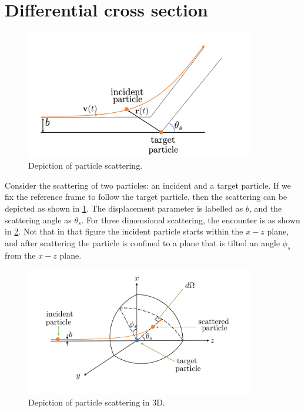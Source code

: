 \documentclass[a4paper,11pt]{report}
\begin{document}
\section{Differential cross section}
\begin{figure}[ht]
    \centering
    \includegraphics[width=10cm]{../../images/scattering.pdf}
    \caption{Depiction of particle scattering.}
    \label{fig:scattering}
\end{figure}

Consider the scattering of two particles: an incident and a target particle. If we fix the reference frame to follow the target particle, then the scattering can be depicted as shown in \cref{fig:scattering}. The displacement parameter is labelled as $b$, and the scattering angle as $\theta_s$. For three dimensional scattering, the encounter is as shown in \cref{fig:scattering_3d}. Not that in that figure the incident particle starts within the $x-z$ plane, and after scattering the particle is confined to a plane that is tilted an angle $\phi_s$ from the $x-z$ plane.

\begin{figure}[ht]
    \centering
    \includegraphics[width=10cm]{../../images/scattering_3d.pdf}
    \caption{Depiction of particle scattering in 3D.}
    \label{fig:scattering_3d}
\end{figure}
\end{document}

